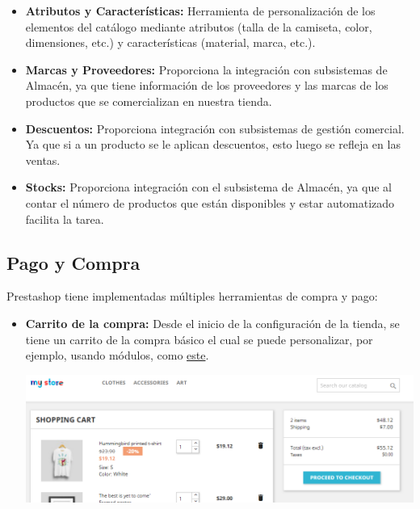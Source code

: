 \documentclass{article}
\begin{document}
\begin{itemize}
				\item[\triangleright] \textbf{Atributos y Características:} Herramienta de personalización de los elementos del catálogo mediante atributos (talla de la camiseta, color, dimensiones, etc.) y características (material, marca, etc.).
			\end{itemize}

\begin{itemize}
				\item[\triangleright] \textbf{Marcas y Proveedores:} Proporciona la integración con subsistemas de Almacén, ya que tiene información de los proveedores y las marcas de los productos que se comercializan en nuestra tienda.
			\end{itemize}
			
			\begin{itemize}
				\item[\triangleright] \textbf{Descuentos:} Proporciona integración con subsistemas de gestión comercial. Ya que si a un producto se le aplican descuentos, esto luego se refleja en las ventas.
			\end{itemize}
			
			\begin{itemize}
				\item[\triangleright] \textbf{Stocks:} Proporciona integración con el subsistema de Almacén, ya que al contar el número de productos que están disponibles y estar automatizado facilita la tarea.
			\end{itemize}
			
\subsection{Pago y Compra}

Prestashop tiene implementadas múltiples herramientas de compra y pago:

\begin{itemize}
				\item[\triangleright] \textbf{Carrito de la compra:} Desde el inicio de la configuración de la tienda, se tiene un carrito de la compra básico el cual se puede personalizar, por ejemplo, usando módulos, como \href{https://addons.prestashop.com/en/emails-notifications/26203-browser-tab-notification-favicon.html?utm_source=back-office&utm_medium=push-addons&utm_campaign=back-office-EN&utm_content=download}{este}.
				\begin{center}
				\includegraphics[scale=0.4]{images/carrito.png}
				\end{center}
			\end{itemize}
\end{document}
